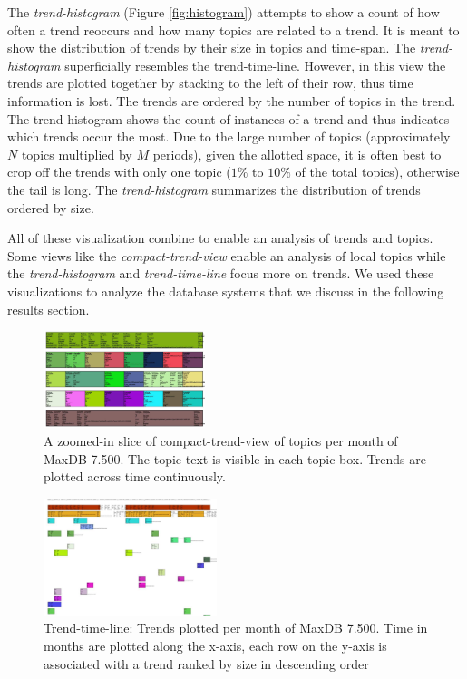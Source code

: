 \documentclass[times, 10pt,twocolumn]{article}
\begin{document}
 The \emph{trend-histogram} (Figure \ref{fig:histogram}) attempts
  to show a count of how often a trend reoccurs and how many topics
  are related to a trend. It is meant to show the distribution of
  trends by their size in topics and time-span.  The
\emph{trend-histogram} superficially resembles the trend-time-line.
However, in this view the trends are plotted together by stacking to
the left of their row, thus time information is lost.  The trends are
ordered by the number of topics in the trend.  The trend-histogram
shows the count of instances of a trend and thus indicates which
trends occur the most. Due to the large number of topics
(approximately $N$ topics multiplied by $M$ periods), given the
allotted space, it is often best to crop off the trends with only one
topic ($1\%$ to $10\%$ of the total topics), otherwise the tail is
long. The \emph{trend-histogram} summarizes the distribution of
trends ordered by size.

 All of these visualization combine to enable an analysis of
  trends and topics. Some views like the \emph{compact-trend-view}
  enable an analysis of local topics while the \emph{trend-histogram}
  and \emph{trend-time-line} focus more on trends. We used these
  visualizations to analyze the database systems that we discuss in
  the following results section.  

\begin{figure}[t]
  \centering
  \includegraphics[width=0.42\textwidth]{fixed-time-smear-plot-cropped}
  \caption{A zoomed-in slice of compact-trend-view of topics per month of MaxDB 7.500. The topic text is visible in each topic box. Trends are plotted across time continuously.}
  \label{fig:zoomedsmear}
\end{figure}


\begin{figure}
  \centering
  \includegraphics[width=0.45\textwidth]{class-smear-plot-crop-scaled}
  \caption{Trend-time-line: Trends plotted per month of MaxDB 7.500. Time in months are plotted along the x-axis, each row on the y-axis is associated with a trend ranked by size in descending order}         
  \label{fig:trendtimeline}
\end{figure}
\end{document}

